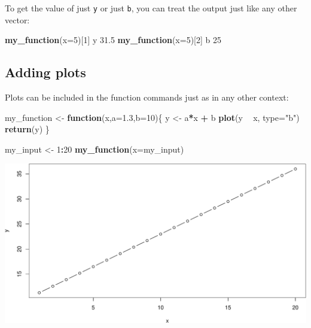 \documentclass[
]{book}
\newenvironment{Shaded}{\begin{snugshade}}{\end{snugshade}}
\newcommand{\ControlFlowTok}[1]{\textcolor[rgb]{0.13,0.29,0.53}{\textbf{#1}}}
\newcommand{\DataTypeTok}[1]{\textcolor[rgb]{0.13,0.29,0.53}{#1}}
\newcommand{\DecValTok}[1]{\textcolor[rgb]{0.00,0.00,0.81}{#1}}
\newcommand{\FloatTok}[1]{\textcolor[rgb]{0.00,0.00,0.81}{#1}}
\newcommand{\KeywordTok}[1]{\textcolor[rgb]{0.13,0.29,0.53}{\textbf{#1}}}
\newcommand{\NormalTok}[1]{#1}
\newcommand{\OperatorTok}[1]{\textcolor[rgb]{0.81,0.36,0.00}{\textbf{#1}}}
\newcommand{\StringTok}[1]{\textcolor[rgb]{0.31,0.60,0.02}{#1}}
\begin{document}
To get the value of just \texttt{y} or just \texttt{b}, you can treat the output just like any other vector:

\begin{Shaded}
\begin{Highlighting}[]
\KeywordTok{my_function}\NormalTok{(}\DataTypeTok{x=}\DecValTok{5}\NormalTok{)[}\DecValTok{1}\NormalTok{]}
\NormalTok{   y }
\FloatTok{31.5} 
\KeywordTok{my_function}\NormalTok{(}\DataTypeTok{x=}\DecValTok{5}\NormalTok{)[}\DecValTok{2}\NormalTok{]}
\NormalTok{ b }
\DecValTok{25} 
\end{Highlighting}
\end{Shaded}

\hypertarget{adding-plots}{%
\subsection*{Adding plots}\label{adding-plots}}

Plots can be included in the function commands just as in any other context:

\begin{Shaded}
\begin{Highlighting}[]
\NormalTok{my_function <-}\StringTok{ }\ControlFlowTok{function}\NormalTok{(x,}\DataTypeTok{a=}\FloatTok{1.3}\NormalTok{,}\DataTypeTok{b=}\DecValTok{10}\NormalTok{)\{}
\NormalTok{  y <-}\StringTok{ }\NormalTok{a}\OperatorTok{*}\NormalTok{x }\OperatorTok{+}\StringTok{ }\NormalTok{b}
  \KeywordTok{plot}\NormalTok{(y }\OperatorTok{~}\StringTok{ }\NormalTok{x, }\DataTypeTok{type=}\StringTok{"b"}\NormalTok{)}
  \KeywordTok{return}\NormalTok{(y)}
\NormalTok{\}}
\end{Highlighting}
\end{Shaded}

\begin{Shaded}
\begin{Highlighting}[]
\NormalTok{my_input <-}\StringTok{ }\DecValTok{1}\OperatorTok{:}\DecValTok{20}
\KeywordTok{my_function}\NormalTok{(}\DataTypeTok{x=}\NormalTok{my_input)}
\end{Highlighting}
\end{Shaded}

\includegraphics{figures/unnamed-chunk-252-1.pdf}
\end{document}
